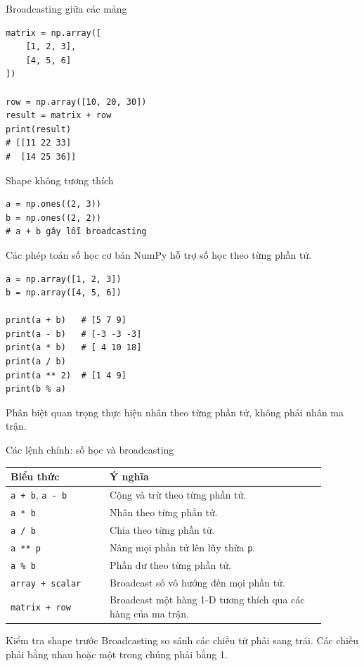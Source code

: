 \documentclass[aspectratio=169,11pt]{beamer}
\begin{document}
\begin{frame}[fragile]{Broadcasting giữa các mảng}
\small
\begin{lstlisting}[style=py]
matrix = np.array([
    [1, 2, 3],
    [4, 5, 6]
])

row = np.array([10, 20, 30])
result = matrix + row
print(result)
# [[11 22 33]
#  [14 25 36]]
\end{lstlisting}
\begin{alertblock}{Shape không tương thích}
\begin{lstlisting}[style=py]
a = np.ones((2, 3))
b = np.ones((2, 2))
# a + b gây lỗi broadcasting
\end{lstlisting}
\end{alertblock}
\end{frame}

\begin{frame}[fragile]{Các phép toán số học cơ bản}
\small
NumPy hỗ trợ số học theo từng phần tử.
\begin{lstlisting}[style=py]
a = np.array([1, 2, 3])
b = np.array([4, 5, 6])

print(a + b)   # [5 7 9]
print(a - b)   # [-3 -3 -3]
print(a * b)   # [ 4 10 18]
print(a / b)
print(a ** 2)  # [1 4 9]
print(b % a)
\end{lstlisting}
\begin{block}{Phân biệt quan trọng}
\texttt{\*} thực hiện nhân theo từng phần tử, không phải nhân ma trận.
\end{block}
\end{frame}

\begin{frame}{Các lệnh chính: số học và broadcasting}
\small
\begin{tabular}{p{0.28\linewidth}p{0.61\linewidth}}
\toprule
\textbf{Biểu thức} & \textbf{Ý nghĩa} \\
\midrule
\texttt{a + b}, \texttt{a - b} & Cộng và trừ theo từng phần tử. \\
\texttt{a * b} & Nhân theo từng phần tử. \\
\texttt{a / b} & Chia theo từng phần tử. \\
\texttt{a ** p} & Nâng mọi phần tử lên lũy thừa \texttt{p}. \\
\texttt{a \% b} & Phần dư theo từng phần tử. \\
\texttt{array + scalar} & Broadcast số vô hướng đến mọi phần tử. \\
\texttt{matrix + row} & Broadcast một hàng 1-D tương thích qua các hàng của ma trận. \\
\bottomrule
\end{tabular}
\begin{alertblock}{Kiểm tra shape trước}
Broadcasting so sánh các chiều từ phải sang trái. Các chiều phải bằng nhau hoặc một trong chúng phải bằng 1.
\end{alertblock}
\end{frame}
\end{document}
